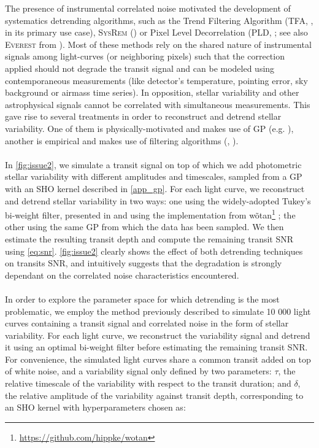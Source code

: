 \documentclass[modern]{aastex631}
\begin{document}
The presence of instrumental correlated noise motivated the development of systematics detrending algorithms, such as the Trend Filtering Algorithm (\textsc{TFA}, \citealt{tfa}, in its primary use case), \textsc{SysRem} (\citealt{sysrem}) or Pixel Level Decorrelation (\textsc{PLD}, \citealt{pld}; see also \textsc{Everest} from \citealt{everest1, everest2}). Most of these methods rely on the shared nature of instrumental signals among light-curves (or neighboring pixels) such that the correction applied should not degrade the transit signal and can be modeled using contemporaneous measurements (like detector's temperature, pointing error, sky background or airmass time series). In opposition, stellar variability and other astrophysical signals cannot be correlated with simultaneous measurements. This gave rise to several treatments in order to reconstruct and detrend stellar variability. One of them is physically-motivated and makes use of GP (e.g. \citealt{k2sc}), another is empirical and makes use of filtering algorithms (\citealt{Jenkins2010}, \citealt{wotan}).\\\\
In \autoref{fig:issue2}, we simulate a transit signal on top of which we add photometric stellar variability with different amplitudes and timescales, sampled from a GP with an SHO kernel described in \autoref{app_gp}. For each light curve, we reconstruct and detrend stellar variability in two ways: one using the widely-adopted Tukey's bi-weight filter, presented in \cite{tukey} and using the implementation from \textsf{wõtan}\footnote{\href{https://github.com/hippke/wotan}{https://github.com/hippke/wotan}} \citep{wotan}; the other using the same GP from which the data has been sampled. We then estimate the resulting transit depth and compute the remaining transit SNR using \autoref{eq:snr}. \autoref{fig:issue2} clearly shows the effect of both detrending techniques on transits SNR, and intuitively suggests that the degradation is strongly dependant on the correlated noise characteristics encountered.\\\\
In order to explore the parameter space for which detrending is the most problematic, we employ the method previously described to simulate 10 000 light curves containing a transit signal and correlated noise in the form of stellar variability. For each light curve, we reconstruct the variability signal and detrend it using an optimal bi-weight filter before estimating the remaining transit SNR. For convenience, the simulated light curves share a common transit added on top of white noise, and a variability signal only defined by two parameters: $\tau$, the relative timescale of the variability with respect to the transit duration; and $\delta$, the relative amplitude of the variability against transit depth, corresponding to an SHO kernel with hyperparameters chosen as: 
\end{document}
